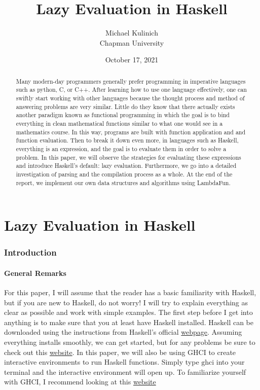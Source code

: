 \documentclass{article}
\title{Lazy Evaluation in Haskell}
\author{Michael Kulinich  \\ Chapman University}
\date{October 17, 2021}
\begin{document}
\maketitle

\begin{abstract}

\medskip\noindent
Many modern-day programmers generally prefer programming in imperative languages such as python, C, or C++. After learning how to use one language effectively, one can swiftly start working with other languages because the thought process and method of answering problems are very similar. Little do they know that there actually exists another paradigm known as functional programming in which the goal is to bind everything in clean mathematical functions similar to what one would see in a mathematics course. In this way, programs are built with function application and and function evaluation. Then to break it down even more, in languages such as Haskell, everything is an expression, and the goal is to evaluate them in order to solve a problem. In this paper, we will observe the strategies for evaluating these expressions and introduce Haskell's default: lazy evaluation. Furthermore, we go into a detailed investigation of parsing and the compilation process as a whole. At the end of the report, we implement our own data structures and algorithms using LambdaFun.
\end{abstract}

\tableofcontents

\part{Lazy Evaluation in Haskell}
\section{Introduction}\label{intro}

\subsection{General Remarks}

\medskip\noindent
For this paper, I will assume that the reader has a basic familiarity with Haskell, but if you are new to Haskell, do not worry! I will try to explain everything as clear as possible and work with simple examples. The first step before I get into anything is to make sure that you at least have Haskell installed. Haskell can be downloaded using the instructions from Haskell's official  \href{https://www.haskell.org/}{webpage}. Assuming everything installs smoothly, we can get started, but for any problems be sure to check out this \href{https://www.haskell.org/platform/}{website}. In this paper, we will also be using GHCI to create interactive environments to run Haskell functions. Simply type $\textrm{ghci}$ into your terminal and the interactive environment will open up. To familiarize yourself with GHCI, I recommend looking at this \href{https://downloads.haskell.org/~ghc/9.0.1/docs/html/users_guide/ghci.html}{website}
\end{document}
